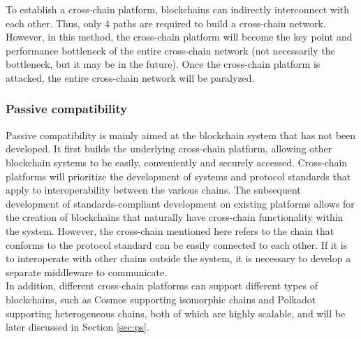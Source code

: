 \begin{enumerate}
\begin{figure}[H]
        \end{figure}
    To establish a cross-chain platform, blockchains can indirectly interconnect with each other. Thus, only 4 paths are required to build a cross-chain network. However, in this method, the cross-chain platform will become the key point and performance bottleneck of the entire cross-chain network (not necessarily the bottleneck, but it may be in the future). Once the cross-chain platform is attacked, the entire cross-chain network will be paralyzed.
\end{enumerate}
\subsubsection{Passive compatibility}
\noindent Passive compatibility is mainly aimed at the blockchain system that has not been developed. It first builds the underlying cross-chain platform, allowing other blockchain systems to be easily, conveniently and securely accessed. Cross-chain platforms will prioritize the development of systems and protocol standards that apply to interoperability between the various chains. The subsequent development of standards-compliant development on existing platforms allows for the creation of blockchains that naturally have cross-chain functionality within the system. However, the cross-chain mentioned here refers to the chain that conforms to the protocol standard can be easily connected to each other. If it is to interoperate with other chains outside the system, it is necessary to develop a separate middleware to communicate.\\

\noindent In addition, different cross-chain platforms can support different types of blockchains, such as Cosmos supporting isomorphic chains and Polkadot supporting heterogeneous chains, both of which are highly scalable, and will be later discussed in Section \ref{sec:ps}.